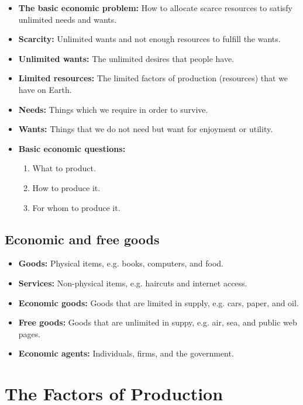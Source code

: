 \documentclass[11pt, a4paper, openany]{book}
\begin{document}
\begin{itemize}\itemsep0em
	\item \textbf{The basic economic problem:} How to allocate scarce resources to satisfy unlimited needs and wants.
	\item \textbf{Scarcity:} Unlimited wants and not enough resources to fulfill the wants.
	\item \textbf{Unlimited wants:} The unlimited desires that people have.
	\item \textbf{Limited resources:} The limited factors of production (resources) that we have on Earth.
    \item \textbf{Needs:} Things which we require in order to survive.
    \item \textbf{Wants:} Things that we do not need but want for enjoyment or utility.
    \item \textbf{Basic economic questions:}
        \begin{enumerate}\itemsep0em
            \item What to product.
            \item How to produce it.
            \item For whom to produce it.
        \end{enumerate}
\end{itemize}

\subsection{Economic and free goods}

\begin{itemize}\itemsep0em
    \item \textbf{Goods:} Physical items, e.g. books, computers, and food.
    \item \textbf{Services:} Non-physical items, e.g. haircuts and internet access.
    \item \textbf{Economic goods:} Goods that are limited in supply, e.g. cars, paper, and oil.
    \item \textbf{Free goods:} Goods that are unlimited in suppy, e.g. air, sea, and public web pages.
    \item \textbf{Economic agents:} Individuals, firms, and the government.
\end{itemize}

\section{The Factors of Production}
\end{document}
